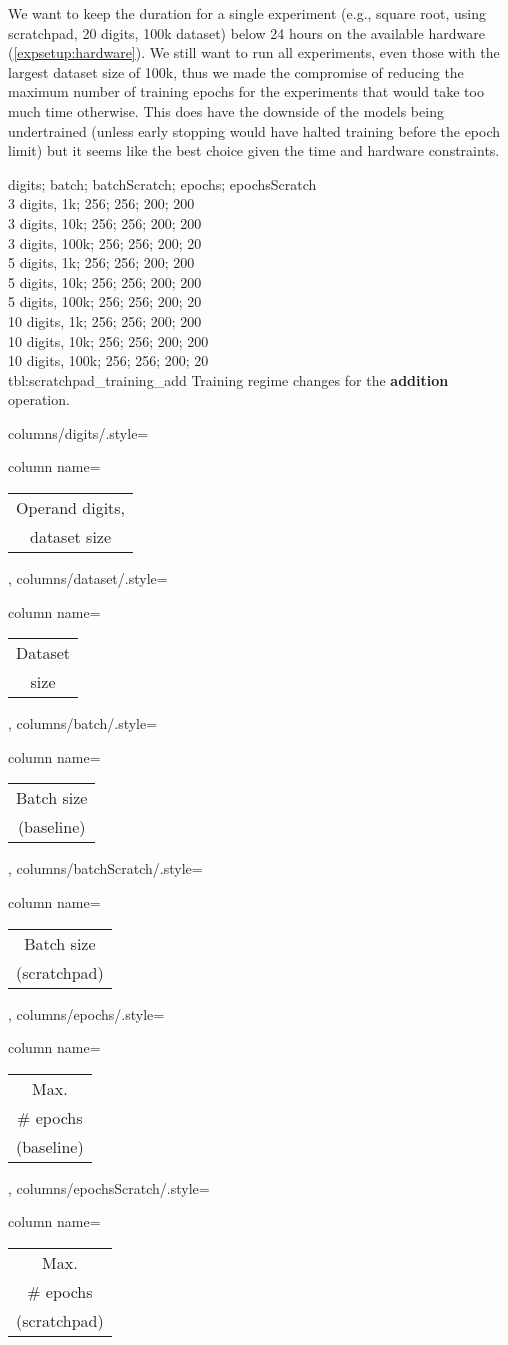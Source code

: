 We want to keep the duration for a single experiment (e.g., square root, using scratchpad, 20 digits, 100k dataset) below 24 hours on the available hardware (\cref{expsetup:hardware}).
We still want to run all experiments, even those with the largest dataset size of 100k, thus we made the compromise of reducing the maximum number of training epochs for the experiments that would take too much time otherwise. This does have the downside of the models being undertrained (unless early stopping would have halted training before the epoch limit) but it seems like the best choice given the time and hardware constraints.

{
    digits; batch; batchScratch; epochs; epochsScratch\\
    3 digits,  1k;  256; 256; 200; 200\\
    3 digits,  10k;  256; 256; 200; 200\\
    3 digits,  100k;  256; 256; 200; 20\\
    5 digits,  1k;  256; 256; 200; 200\\
    5 digits,  10k;  256; 256; 200; 200\\
    5 digits,  100k;  256; 256; 200; 20\\
    10 digits,  1k;  256; 256; 200; 200\\
    10 digits,  10k;  256; 256; 200; 200\\
    10 digits,  100k;  256; 256; 200; 20\\
}
{tbl:scratchpad_training_add}
{
    Training regime changes for the \textbf{addition} operation.
}
{%
    columns/digits/.style={column name={\begin{tabular}{c}
         Operand digits, \\
         dataset size
    \end{tabular}}},
    columns/dataset/.style={column name={\begin{tabular}{c}
         Dataset \\
         size
    \end{tabular}}},
    columns/batch/.style={column name={\begin{tabular}{c}
         Batch size \\
         (baseline)
    \end{tabular}}},
    columns/batchScratch/.style={column name={\begin{tabular}{c}
         Batch size \\
         (scratchpad)
    \end{tabular}}},
    columns/epochs/.style={column name={\begin{tabular}{c}
         Max. \\
         \# epochs \\
         (baseline)
    \end{tabular}}},
    columns/epochsScratch/.style={column name={\begin{tabular}{c}
         Max. \\
         \# epochs \\
         (scratchpad)
    \end{tabular}}}
}

